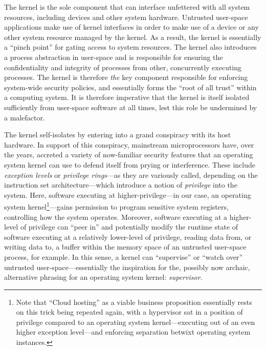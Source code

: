 \documentclass[a4paper, UKenglish, cleveref, autoref, thm-restate, colorlinks]{lipics-v2021}
\begin{document}
The kernel is the sole component that can interface unfettered with all system resources, including devices and other system hardware.
Untrusted user-space applications make use of kernel interfaces in order to make use of a device or any other system resource managed by the kernel.
As a result, the kernel is essentially a ``pinch point'' for gating access to system resources.
The kernel also introduces a process abstraction in user-space and is responsible for ensuring the confidentiality and integrity of processes from other, concurrently executing processes.
The kernel is therefore \emph{the} key component responsible for enforcing system-wide security policies, and essentially forms the ``root of all trust'' within a computing system.
It is therefore imperative that the kernel is itself isolated sufficiently from user-space software at all times, lest this role be undermined by a malefactor.

The kernel self-isolates by entering into a grand conspiracy with its host hardware.
In support of this conspiracy, mainstream microprocessors have, over the years, accreted a variety of now-familiar security features that an operating system kernel can use to defend itself from prying or interference.
These include \emph{exception levels} or \emph{privilege rings}---as they are variously called, depending on the instruction set architecture---which introduce a notion of \emph{privilege} into the system.
Here, software executing at higher-privilege---in our case, an operating system kernel\footnote{Note that ``Cloud hosting'' as a viable business proposition essentially rests on this trick being repeated again, with a hypervisor sat in a position of privilege compared to an operating system kernel---executing out of an even higher exception level---and enforcing separation betwixt operating system instances.}---gains permission to program sensitive system registers, controlling how the system operates.
Moreover, software executing at a higher-level of privilege can ``peer in'' and potentially modify the runtime state of software executing at a relatively lower-level of privilege, reading data from, or writing data to, a buffer within the memory space of an untrusted user-space process, for example.
In this sense, a kernel can ``supervise'' or ``watch over'' untrusted user-space---essentially the inspiration for the, possibly now archaic, alternative phrasing for an operating system kernel: \emph{supervisor}.
\end{document}
